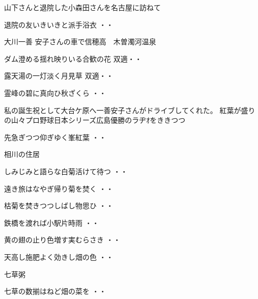 \vspace{0.6cm}
山下さんと退院した小森田さんを名古屋に訪ねて
\begin{shiika}退院の友いきいきと派手浴衣
\hfill{・・}\end{shiika}
\vspace{0.6cm}
大川一善 安子さんの車で信穂高　木曽濁河温泉
\begin{shiika}ダム澄める揺れ映りいる合歓の花
\hfill{双適・・}\end{shiika}
\begin{shiika}露天湯の一灯淡く月見草
\hfill{双適・・}\end{shiika}
\begin{shiika}霊峰の碧に真向ひ秋ざくら
\hfill{・・}\end{shiika}
\vspace{0.6cm}
私の誕生祝として大台ケ原へ一善安子さんがドライブしてくれた。
紅葉が盛りの山々プロ野球日本シリーズ広島優勝のラヂｵをききつつ
\begin{shiika}先急ぎつつ仰ぎゆく峯紅葉
\hfill{・・}\end{shiika}
\vspace{0.6cm}
相川の住居
\begin{shiika}しみじみと語らな白菊活けて待つ
\hfill{・・}\end{shiika}
\begin{shiika}遠き旅はなやぎ帰り菊を焚く
\hfill{・・}\end{shiika}
\begin{shiika}枯菊を焚きつつしばし物思ひ
\hfill{・・}\end{shiika}
\begin{shiika}鉄橋を渡れば小駅片時雨
\hfill{・・}\end{shiika}
\begin{shiika}黄の翅の止り色増す実むらさき
\hfill{・・}\end{shiika}
\begin{shiika}天高し施肥よく効きし畑の色
\hfill{・・}\end{shiika}
\vspace{0.6cm}
七草粥
\begin{shiika}七草の数揃はねど畑の菜を
\hfill{・・}\end{shiika}
